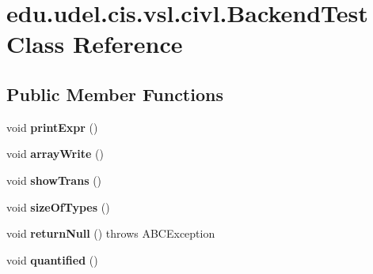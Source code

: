 \hypertarget{classedu_1_1udel_1_1cis_1_1vsl_1_1civl_1_1BackendTest}{}\section{edu.\+udel.\+cis.\+vsl.\+civl.\+Backend\+Test Class Reference}
\label{classedu_1_1udel_1_1cis_1_1vsl_1_1civl_1_1BackendTest}
\subsection*{Public Member Functions}
\begin{DoxyCompactItemize}
\item 
\hypertarget{classedu_1_1udel_1_1cis_1_1vsl_1_1civl_1_1BackendTest_aefad44da05485228b25041fae252733d}{}void {\bfseries print\+Expr} ()\label{classedu_1_1udel_1_1cis_1_1vsl_1_1civl_1_1BackendTest_aefad44da05485228b25041fae252733d}

\item 
\hypertarget{classedu_1_1udel_1_1cis_1_1vsl_1_1civl_1_1BackendTest_ac3d011cb246a71708b25e85a7a5b7113}{}void {\bfseries array\+Write} ()\label{classedu_1_1udel_1_1cis_1_1vsl_1_1civl_1_1BackendTest_ac3d011cb246a71708b25e85a7a5b7113}

\item 
\hypertarget{classedu_1_1udel_1_1cis_1_1vsl_1_1civl_1_1BackendTest_abb4e117509ed2a96d2a55ee4e33d4285}{}void {\bfseries show\+Trans} ()\label{classedu_1_1udel_1_1cis_1_1vsl_1_1civl_1_1BackendTest_abb4e117509ed2a96d2a55ee4e33d4285}

\item 
\hypertarget{classedu_1_1udel_1_1cis_1_1vsl_1_1civl_1_1BackendTest_a562ca5a8069b5eb4969a882825579150}{}void {\bfseries size\+Of\+Types} ()\label{classedu_1_1udel_1_1cis_1_1vsl_1_1civl_1_1BackendTest_a562ca5a8069b5eb4969a882825579150}

\item 
\hypertarget{classedu_1_1udel_1_1cis_1_1vsl_1_1civl_1_1BackendTest_a22ba6d5569f3e86910a79e02b0fa9d05}{}void {\bfseries return\+Null} ()  throws A\+B\+C\+Exception \label{classedu_1_1udel_1_1cis_1_1vsl_1_1civl_1_1BackendTest_a22ba6d5569f3e86910a79e02b0fa9d05}

\item 
\hypertarget{classedu_1_1udel_1_1cis_1_1vsl_1_1civl_1_1BackendTest_a2bfe8a5cad84f42dde6e6933ecd7ac7b}{}void {\bfseries quantified} ()\label{classedu_1_1udel_1_1cis_1_1vsl_1_1civl_1_1BackendTest_a2bfe8a5cad84f42dde6e6933ecd7ac7b}

\end{DoxyCompactItemize}

